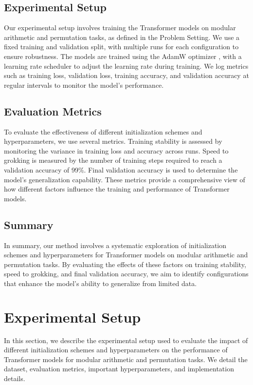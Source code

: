\documentclass{article} %
\begin{document}
\subsection{Experimental Setup}
Our experimental setup involves training the Transformer models on modular arithmetic and permutation tasks, as defined in the Problem Setting. We use a fixed training and validation split, with multiple runs for each configuration to ensure robustness. The models are trained using the AdamW optimizer \citep{loshchilov2017adamw}, with a learning rate scheduler to adjust the learning rate during training. We log metrics such as training loss, validation loss, training accuracy, and validation accuracy at regular intervals to monitor the model's performance.

\subsection{Evaluation Metrics}
To evaluate the effectiveness of different initialization schemes and hyperparameters, we use several metrics. Training stability is assessed by monitoring the variance in training loss and accuracy across runs. Speed to grokking is measured by the number of training steps required to reach a validation accuracy of 99\%. Final validation accuracy is used to determine the model's generalization capability. These metrics provide a comprehensive view of how different factors influence the training and performance of Transformer models.

\subsection{Summary}
In summary, our method involves a systematic exploration of initialization schemes and hyperparameters for Transformer models on modular arithmetic and permutation tasks. By evaluating the effects of these factors on training stability, speed to grokking, and final validation accuracy, we aim to identify configurations that enhance the model's ability to generalize from limited data.

\section{Experimental Setup}
\label{sec:experimental}

In this section, we describe the experimental setup used to evaluate the impact of different initialization schemes and hyperparameters on the performance of Transformer models for modular arithmetic and permutation tasks. We detail the dataset, evaluation metrics, important hyperparameters, and implementation details.
\end{document}
